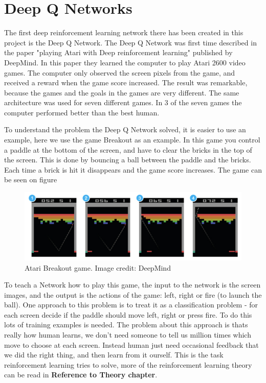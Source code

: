\section{Deep Q Networks}
\label{sec:DQN}
The first deep reinforcement learning network there has been created in this project is the Deep Q Network. The Deep Q Network was first time described in the paper "playing Atari with Deep reinforcement learning" \cite{DBLP:journals/corr/MnihKSGAWR13} published by DeepMind. In this paper they learned the computer to play Atari 2600 video games. The computer only observed the screen pixels from the game, and received a reward when the game score increased. The result was remarkable, because the games and the goals in the games are very different. The same architecture was used for seven different games. In 3 of the seven games the computer performed better than the best human. 

To understand the problem the Deep Q Network solved, it is easier to use an example, here we use the game Breakout as an example. In this game you control a paddle at the bottom of the screen, and have to clear the bricks in the top of the screen. This is done by bouncing a ball between the paddle and the bricks. Each time a brick is hit it disappears and the game score increases. The game can be seen on figure 

\begin{figure}[H]
	\centering
	\includegraphics[width=1\textwidth]{Figures/Architecture/DQN/Atari_breakout.png}
	\caption{Atari Breakout game. Image credit: DeepMind\cite{DBLP:journals/corr/MnihKSGAWR13} }
	\label{fig:Atari_breakout}
\end{figure}

To teach a Network how to play this game, the input to the network is the screen images, and the output is the actions of the game: left, right or fire (to launch the ball). One approach to this problem is to treat it as a classification problem - for each screen decide if the paddle should move left, right or press fire. To do this lots of training examples is needed. The problem about this approach is thats really how human learns, we don't need someone to tell us million times which move to choose at each screen. Instead human just need occasional feedback that we did the right thing, and then learn from it ourself. This is the task reinforcement learning tries to solve, more of the reinforcement learning theory can be read in \textbf{Reference to Theory chapter}.

